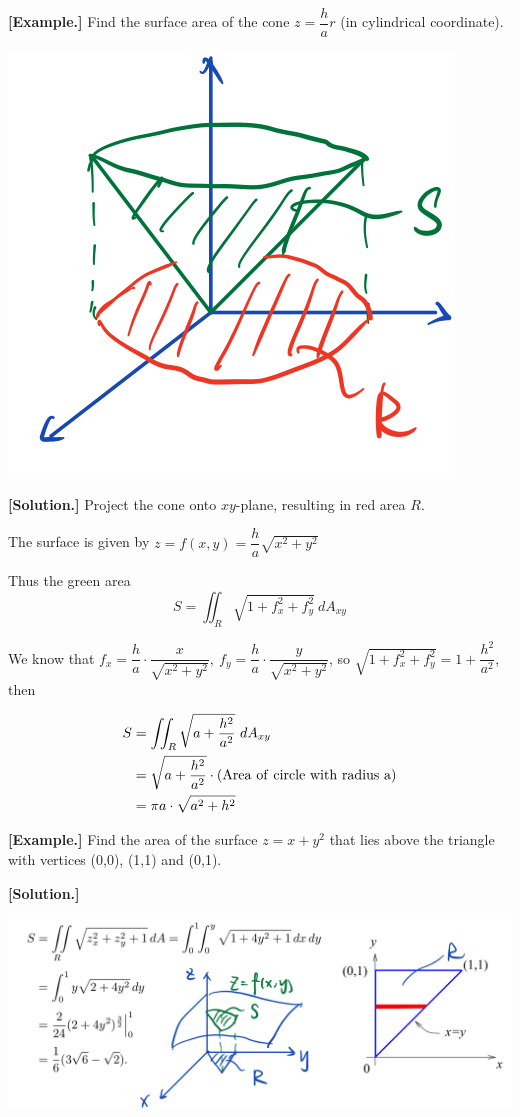 \documentclass[11pt, a4paper]{MATH2023}
\newcommand{\eg}{\textbf{[Example.] }}
\newcommand{\sol}{\textbf{[Solution.] }}
\begin{document}
\begin{spacing}{1.3}
    \newpage
    \eg Find the surface area of the cone $z=\dfrac{h}{a}r$ (in cylindrical coordinate).
    \begin{center}
        \includegraphics[scale=0.25]{images/Ch14-surface-area-eg2.jpeg}
    \end{center}

    \sol Project the cone onto $xy$-plane, resulting in red area $R$.

    The surface is given by $z=f(x,y)=\dfrac{h}{a}\sqrt{x^2+y^2}$

    Thus the green area $$S=\iint_R\sqrt{1+f_x^2+f_y^2}\ dA_{xy}$$

    We know that $f_x=\dfrac{h}{a}\cdot \dfrac{x}{\sqrt{x^2+y^2}},\ f_y=\dfrac{h}{a}\cdot \dfrac{y}{\sqrt{x^2+y^2}}$, so 
    $\sqrt{1+f_x^2+f_y^2}=1+\dfrac{h^2}{a^2}$, then

    \begin{align*}
        S &= \iint_R \sqrt{a+\frac{h^2}{a^2}}\ dA_{xy}\\ 
          &= \sqrt{a+\frac{h^2}{a^2}} \cdot {\rm (Area\ of\ circle\ with\ radius\ a)}\\
          &= \pi a\cdot \sqrt{a^2+h^2}
    \end{align*}

    \vspace{0.5in}
    \eg Find the area of the surface $z=x+y^2$ that lies above the triangle with vertices (0,0), (1,1)
    and (0,1).

    \sol 
    \begin{center}
        \includegraphics[scale=0.3]{images/Ch14-surface-area-eg3.jpeg}
    \end{center}



\end{spacing}
\end{document}
